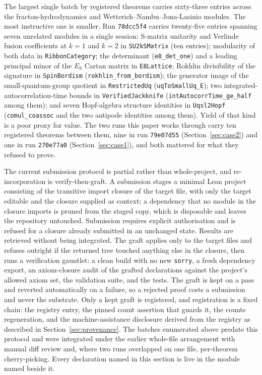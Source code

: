 \documentclass[11pt]{article}
\begin{document}
The largest single batch by registered theorems carries sixty-three
entries across the fracton-hydrodynamics and
Wetterich--Nambu--Jona-Lasinio modules. The most instructive one is
smaller. Run \texttt{78dcc5f4} carries twenty-five
entries spanning seven unrelated modules in a single session:
S-matrix unitarity and Verlinde fusion coefficients at $k = 1$ and
$k = 2$ in \texttt{SU2kSMatrix} (ten entries); modularity of both
data in \texttt{RibbonCategory}; the determinant
(\texttt{e8\_det\_one}) and a leading principal minor of the $E_8$
Cartan matrix in \texttt{E8Lattice}; Rokhlin divisibility of the
signature in \texttt{SpinBordism} (\texttt{rokhlin\_from\_bordism});
the generator image of the small-quantum-group quotient in
\texttt{RestrictedUq} (\texttt{uqToSmallUq\_E}); two
integrated-autocorrelation-time bounds in \texttt{VerifiedJackknife}
(\texttt{intAutocorrTime\_ge\_half} among them); and seven
Hopf-algebra structure identities in \texttt{Uqsl2Hopf}
(\texttt{comul\_coassoc} and the two antipode identities among them).
Yield of that kind is a poor proxy for value. The two runs this paper
works through carry ten registered theorems between them, nine in run
\texttt{79e07d55} (Section~\ref{sec:case2}) and one in run
\texttt{270e77a0} (Section~\ref{sec:case1}), and both mattered for
what they refused to prove.

The current submission protocol is partial rather than whole-project,
and re-incorporation is verify-then-graft. A submission stages a
minimal Lean project consisting of the transitive import closure of
the target file, with only the target editable and the closure
supplied as context; a dependency that no module in the closure
imports is pruned from the staged copy, which is disposable and leaves
the repository untouched. Submission requires explicit authorisation
and is refused for a closure already submitted in an unchanged state.
Results are retrieved without being integrated. The graft applies only
to the target files and refuses outright if the returned tree touched
anything else in the closure, then runs a verification gauntlet: a
clean build with no new \texttt{sorry}, a fresh dependency export, an
axiom-closure audit of the grafted declarations against the project's
allowed axiom set, the validation suite, and the tests. The graft is
kept on a pass and reverted automatically on a failure, so a rejected
proof costs a submission and never the substrate. Only a kept graft is
registered, and registration is a fixed chain: the registry entry, the
pinned count assertion that guards it, the counts regeneration, and
the machine-assistance disclosure derived from the registry as
described in Section~\ref{sec:provenance}. The batches enumerated
above predate this protocol and were integrated under the earlier
whole-file arrangement with manual diff review and, where two runs
overlapped on one file, per-theorem cherry-picking. Every declaration
named in this section is live in the module named beside it.
\end{document}
